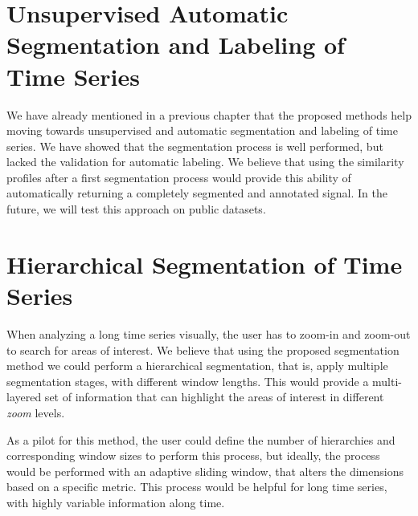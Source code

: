 \section{Unsupervised Automatic Segmentation and Labeling of Time Series}

We have already mentioned in a previous chapter that the proposed methods help moving towards unsupervised and automatic segmentation and labeling of time series. We have showed that the segmentation process is well performed, but lacked the validation for automatic labeling. We believe that using the similarity profiles after a first segmentation process would provide this ability of automatically returning a completely segmented and annotated signal. In the future, we will test this approach on public datasets.



\section{Hierarchical Segmentation of Time Series}

When analyzing a long time series visually, the user has to zoom-in and zoom-out to search for areas of interest. We believe that using the proposed segmentation method we could perform a hierarchical segmentation, that is, apply multiple segmentation stages, with different window lengths. This would provide a multi-layered set of information that can highlight the areas of interest  in different \textit{zoom} levels.
\par
As a pilot for this method, the user could define the number of hierarchies  and corresponding window sizes to perform this process, but ideally, the process would be performed with an adaptive sliding window, that alters the dimensions based on a specific metric. This process would be helpful for long time series, with highly variable information along time.

